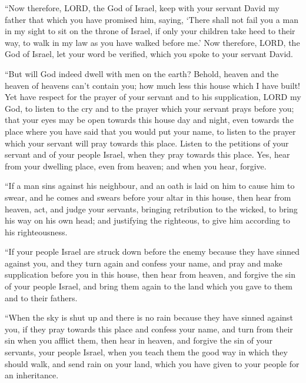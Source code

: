  ``Now therefore, LORD, the God of Israel, keep with your
servant David my father that which you have promised him, saying, `There
shall not fail you a man in my sight to sit on the throne of Israel, if
only your children take heed to their way, to walk in my law as you have
walked before me.'  Now therefore, LORD, the God of
Israel, let your word be verified, which you spoke to your servant
David.

 ``But will God indeed dwell with men on the earth?
Behold, heaven and the heaven of heavens can't contain you; how much
less this house which I have built!  Yet have respect for
the prayer of your servant and to his supplication, LORD my God, to
listen to the cry and to the prayer which your servant prays before you;
 that your eyes may be open towards this house day and
night, even towards the place where you have said that you would put
your name, to listen to the prayer which your servant will pray towards
this place.  Listen to the petitions of your servant and
of your people Israel, when they pray towards this place. Yes, hear from
your dwelling place, even from heaven; and when you hear, forgive.

 ``If a man sins against his neighbour, and an oath is
laid on him to cause him to swear, and he comes and swears before your
altar in this house,  then hear from heaven, act, and
judge your servants, bringing retribution to the wicked, to bring his
way on his own head; and justifying the righteous, to give him according
to his righteousness.

 ``If your people Israel are struck down before the enemy
because they have sinned against you, and they turn again and confess
your name, and pray and make supplication before you in this house,
 then hear from heaven, and forgive the sin of your
people Israel, and bring them again to the land which you gave to them
and to their fathers.

 ``When the sky is shut up and there is no rain because
they have sinned against you, if they pray towards this place and
confess your name, and turn from their sin when you afflict them,
 then hear in heaven, and forgive the sin of your
servants, your people Israel, when you teach them the good way in which
they should walk, and send rain on your land, which you have given to
your people for an inheritance.

